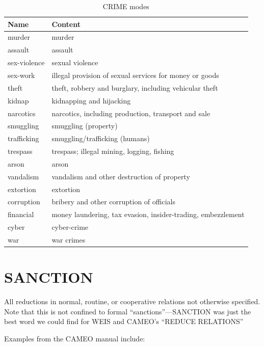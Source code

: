\documentclass[11pt]{report}
\newcommand{\plcat}[1]{\textsf{#1}}
\begin{document}
\begin{table}[htp]
\caption{CRIME modes}
\begin{center}
\begin{tabular}{|l|l|}
\hline
Name & Content \\
\hline
murder & murder \\
assault & assault \\
sex-violence & sexual violence \\
sex-work & illegal provision of sexual services for money or goods \\
theft & theft, robbery and burglary, including vehicular theft\\
kidnap & kidnapping and hijacking \\
narcotics & narcotics, including production, transport and sale \\
smuggling & smuggling (property)  \\
trafficking & smuggling/trafficking (humans)  \\
trespass & trespass; illegal mining, logging, fishing \\
arson & arson \\
vandalism & vandalism and other destruction of property \\
extortion & extortion \\
corruption & bribery and other corruption of officials \\
financial & money laundering, tax evasion, insider-trading, embezzlement \\
cyber & cyber-crime \\
war & war crimes \\
\hline
\end{tabular}
\end{center}
\label{tab:crimemode}
\end{table}%


\newpage  

\section{SANCTION}

All reductions in normal, routine, or cooperative relations not otherwise specified. Note that this is not confined to formal ``sanctions''---\plcat{SANCTION} was just the best word we could find for WEIS and CAMEO's ``REDUCE RELATIONS''

Examples from the CAMEO manual include:
\end{document}
